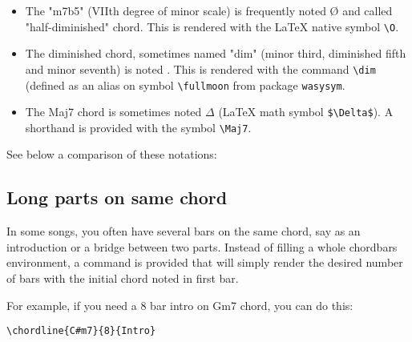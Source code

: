 \documentclass[11pt]{article}
\begin{document}
\begin{itemize}
\item The "m7b5" (VIIth degree of minor scale) is frequently noted \O{} and called "half-diminished" chord.
This is rendered with the \LaTeX{} native symbol {\tt \textbackslash O}.
\item The diminished chord, sometimes named "dim" (minor third, diminished fifth and minor seventh) is noted \dim.
This is rendered with the command {\tt \textbackslash dim}
(defined as an alias on symbol {\tt \textbackslash fullmoon} from package {\tt wasysym}.
\item The Maj7 chord is sometimes noted $\Delta$
(\LaTeX{} math symbol {\tt \$\textbackslash Delta\$}).
A shorthand is provided with the symbol {\tt \textbackslash Maj7}.
\end{itemize}

See below a comparison of these notations:

\def\chordFontSize{\normalsize\bfseries}
\noindent
\begin{minipage}{0.54\textwidth}

\end{minipage}
%
\begin{minipage}{0.42\textwidth}
\def\NumberOfBarsPerLine{5}

\end{minipage}



\subsection{Long parts on same chord}
In some songs, you often have several bars on the same chord, say as an introduction or a bridge between two parts.
Instead of filling a whole chordbars environment, a command is provided that will simply render the desired number of bars with the initial chord noted in first bar.

For example, if you need a 8 bar intro on Gm7 chord, you can do this:
\begin{lstlisting}
\chordline{C#m7}{8}{Intro}
\end{lstlisting}
\end{document}
